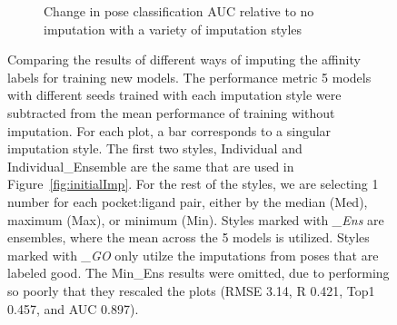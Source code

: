 \documentclass[journal=jmcmar,manuscript=article]{achemso}
\begin{document}
\begin{figure}[tbph]
\begin{subfigure}[t]{0.48\textwidth}
        \caption{Change in pose classification AUC relative to no imputation with a variety of imputation styles}
    \end{subfigure}
    \caption{Comparing the results of different ways of imputing the affinity labels for training new models. The performance metric 5 models with different seeds trained with each imputation style were subtracted from the mean performance of training without imputation. For each plot, a bar corresponds to a singular imputation style. The first two styles, Individual and Individual\_Ensemble are the same that are used in Figure~\ref{fig:initialImp}. For the rest of the styles, we are selecting 1 number for each pocket:ligand pair, either by the median (Med), maximum (Max), or minimum (Min). Styles marked with \textit{\_Ens} are ensembles, where the mean across the 5 models is utilized. Styles marked with \textit{\_GO} only utilze the imputations from poses that are labeled good. The Min\_Ens results were omitted, due to performing so poorly that they rescaled the plots (RMSE 3.14, R 0.421, Top1 0.457, and AUC 0.897).}
    \label{fig:compareImp}
\end{figure}
\end{document}
